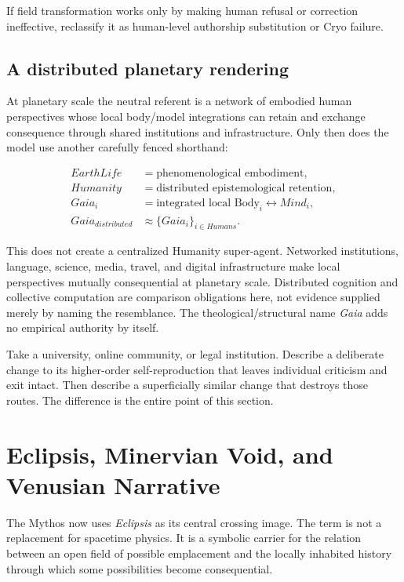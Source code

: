 \documentclass[11pt]{article}
\begin{document}
If field transformation works only by making human refusal or correction ineffective, reclassify it as human-level authorship substitution or Cryo failure.

\subsection{A distributed planetary rendering}

At planetary scale the neutral referent is a network of embodied human perspectives whose local body/model integrations can retain and exchange consequence through shared institutions and infrastructure. Only then does the model use another carefully fenced shorthand:

\begin{align}
EarthLife &= \text{phenomenological embodiment},\\
Humanity &= \text{distributed epistemological retention},\\
Gaia_i &= \text{integrated local Body}_i\leftrightarrow Mind_i,\\
Gaia_{distributed} &\approx \{Gaia_i\}_{i\in Humans}.
\end{align}

This does not create a centralized Humanity super-agent. Networked institutions, language, science, media, travel, and digital infrastructure make local perspectives mutually consequential at planetary scale. Distributed cognition and collective computation are comparison obligations here, not evidence supplied merely by naming the resemblance. The theological/structural name \emph{Gaia} adds no empirical authority by itself.

\begin{readercheck}
Take a university, online community, or legal institution. Describe a deliberate change to its higher-order self-reproduction that leaves individual criticism and exit intact. Then describe a superficially similar change that destroys those routes. The difference is the entire point of this section.
\end{readercheck}

\section{Eclipsis, Minervian Void, and Venusian Narrative}

The Mythos now uses \emph{Eclipsis} as its central crossing image.  The term is
not a replacement for spacetime physics.  It is a symbolic carrier for the
relation between an open field of possible emplacement and the locally inhabited
history through which some possibilities become consequential.
\end{document}
